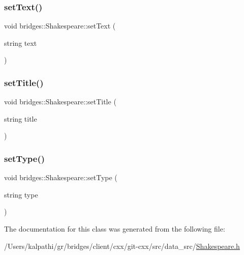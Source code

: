 \hypertarget{classbridges_1_1_shakespeare_a58e8cb2a96ce9af45fcf963694a3aba7}{}\label{classbridges_1_1_shakespeare_a58e8cb2a96ce9af45fcf963694a3aba7} 
\subsubsection{\texorpdfstring{set\+Text()}{setText()}}
{\footnotesize\ttfamily void bridges\+::\+Shakespeare\+::set\+Text (\begin{DoxyParamCaption}\item[{string}]{text }\end{DoxyParamCaption})\hspace{0.3cm}{\ttfamily [inline]}}

\hypertarget{classbridges_1_1_shakespeare_a533ff5a5dd8681ab1156c7345f85ad82}{}\label{classbridges_1_1_shakespeare_a533ff5a5dd8681ab1156c7345f85ad82} 
\subsubsection{\texorpdfstring{set\+Title()}{setTitle()}}
{\footnotesize\ttfamily void bridges\+::\+Shakespeare\+::set\+Title (\begin{DoxyParamCaption}\item[{string}]{title }\end{DoxyParamCaption})\hspace{0.3cm}{\ttfamily [inline]}}

\hypertarget{classbridges_1_1_shakespeare_a2bc1ebcfa8b28a590a1f6f83e26ce051}{}\label{classbridges_1_1_shakespeare_a2bc1ebcfa8b28a590a1f6f83e26ce051} 
\subsubsection{\texorpdfstring{set\+Type()}{setType()}}
{\footnotesize\ttfamily void bridges\+::\+Shakespeare\+::set\+Type (\begin{DoxyParamCaption}\item[{string}]{type }\end{DoxyParamCaption})\hspace{0.3cm}{\ttfamily [inline]}}



The documentation for this class was generated from the following file\+:\begin{DoxyCompactItemize}
\item 
/\+Users/kalpathi/gr/bridges/client/cxx/git-\/cxx/src/data\+\_\+src/\hyperlink{_shakespeare_8h}{Shakespeare.\+h}\end{DoxyCompactItemize}
